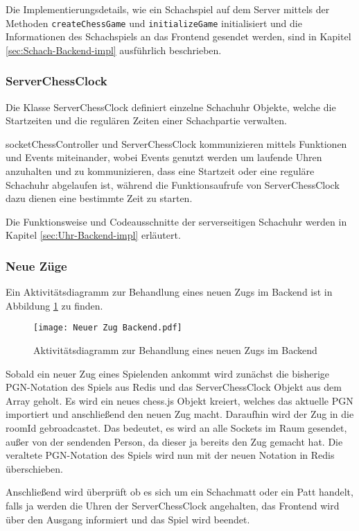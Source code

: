Die Implementierungsdetails, wie ein Schachspiel auf dem Server mittels der Methoden \verb|createChessGame| und \verb|initializeGame| initialisiert und die Informationen des Schachspiels an das Frontend gesendet werden, sind in Kapitel \ref{sec:Schach-Backend-impl} ausführlich beschrieben.

\subsubsection{ServerChessClock}
Die Klasse ServerChessClock definiert einzelne Schachuhr Objekte, welche die Startzeiten und die regulären Zeiten einer Schachpartie verwalten.

socketChessController und ServerChessClock kommunizieren mittels Funktionen und Events miteinander, wobei Events genutzt werden um laufende Uhren anzuhalten und zu kommunizieren, dass eine Startzeit oder eine reguläre Schachuhr abgelaufen ist, während die Funktionsaufrufe von ServerChessClock dazu dienen eine bestimmte Zeit zu starten.

Die Funktionsweise und Codeausschnitte der serverseitigen Schachuhr werden in Kapitel \ref{sec:Uhr-Backend-impl} erläutert.

\subsubsection{Neue Züge}
\label{sec:Zug-Backend}
Ein Aktivitätsdiagramm zur Behandlung eines neuen Zugs im Backend ist in Abbildung \ref{fig:Zug-Backend} zu finden. 

\begin{figure}[!htb]
\centering
\texttt{[image: Neuer Zug Backend.pdf]}
\caption{Aktivitätsdiagramm zur Behandlung eines neuen Zugs im Backend}
\label{fig:Zug-Backend}
\end{figure}

Sobald ein neuer Zug eines Spielenden ankommt wird zunächst die bisherige PGN-Notation des Spiels aus Redis und das ServerChessClock Objekt aus dem Array geholt. Es wird ein neues chess.js Objekt kreiert, welches das aktuelle PGN importiert und anschließend den neuen Zug macht. Daraufhin wird der Zug in die roomId gebroadcastet. Das bedeutet, es wird an alle Sockets im Raum gesendet, außer von der sendenden Person, da dieser ja bereits den Zug gemacht hat. Die veraltete PGN-Notation des Spiels wird nun mit der neuen Notation in Redis überschieben.

Anschließend wird überprüft ob es sich um ein Schachmatt oder ein Patt handelt, falls ja werden die Uhren der ServerChessClock angehalten, das Frontend wird über den Ausgang informiert und das Spiel wird beendet. 

